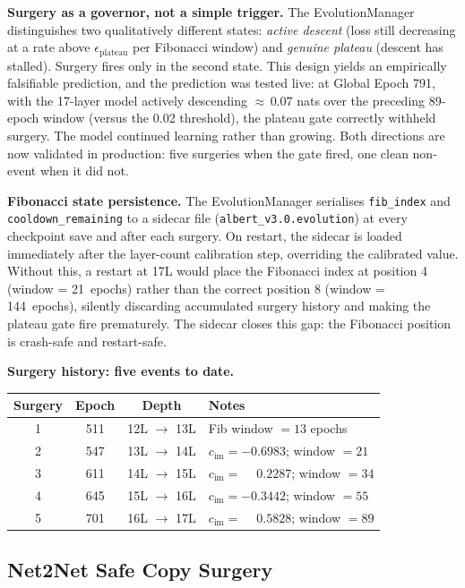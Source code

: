 \documentclass[journal,10pt,twocolumn]{IEEEtran}
\begin{document}
\textbf{Surgery as a governor, not a simple trigger.}
The EvolutionManager distinguishes two qualitatively different states:
\emph{active descent} (loss still decreasing at a rate above
$\epsilon_\text{plateau}$ per Fibonacci window) and \emph{genuine plateau}
(descent has stalled). Surgery fires only in the second state.
This design yields an empirically falsifiable prediction, and the
prediction was tested live: at Global Epoch 791, with the 17-layer model
actively descending ${\approx}\,0.07$ nats over the preceding 89-epoch
window (versus the 0.02 threshold), the plateau gate correctly withheld
surgery. The model continued learning rather than growing.
Both directions are now validated in production: five surgeries when the
gate fired, one clean non-event when it did not.

\textbf{Fibonacci state persistence.} The EvolutionManager serialises
\texttt{fib\_index} and \texttt{cooldown\_remaining} to a sidecar file
(\texttt{albert\_v3.0.evolution}) at every checkpoint save and after each
surgery. On restart, the sidecar is loaded immediately after the
layer-count calibration step, overriding the calibrated value. Without this,
a restart at 17L would place the Fibonacci index at position 4
(window = 21~epochs) rather than the correct position 8
(window = 144~epochs), silently discarding accumulated surgery history
and making the plateau gate fire prematurely. The sidecar closes this gap:
the Fibonacci position is crash-safe and restart-safe.

\textbf{Surgery history: five events to date.}
\begin{center}
\small
\renewcommand{\arraystretch}{1.2}
\begin{tabular}{cccl}
\toprule
Surgery & Epoch & Depth & Notes \\
\midrule
1 & 511 & 12L $\to$ 13L & Fib window $= 13$ epochs \\
2 & 547 & 13L $\to$ 14L & $c_\text{im} = -0.6983$; window $= 21$ \\
3 & 611 & 14L $\to$ 15L & $c_\text{im} = \phantom{-}0.2287$; window $= 34$ \\
4 & 645 & 15L $\to$ 16L & $c_\text{im} = -0.3442$; window $= 55$ \\
5 & 701 & 16L $\to$ 17L & $c_\text{im} = \phantom{-}0.5828$; window $= 89$ \\
\bottomrule
\end{tabular}
\end{center}

\subsection{Net2Net Safe Copy Surgery}
\label{subsec:net2net}
\end{document}
